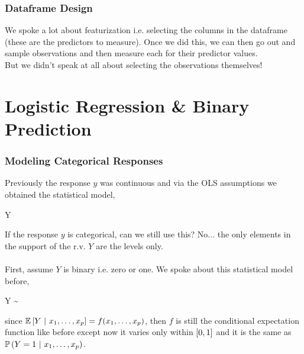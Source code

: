 \documentclass[handout]{beamer}
\begin{document}
\begin{frame}\frametitle{Dataframe Design}

We spoke a lot about featurization i.e. selecting the columns in the dataframe (these are the predictors to measure). Once we did this, we can then go out and sample observations and then measure each for their predictor values. \\

But we didn't speak at all about selecting the observations themselves!


	
\end{frame}



\section{Logistic Regression \& Binary Prediction}


\begin{frame}\frametitle{Modeling Categorical Responses}

Previously the response $y$ was continuous and via the OLS assumptions we obtained the statistical model,

\beqn
Y \inddist {}
\eeqn

If the response $y$ is categorical, can we still use this? No... the only elements in the support of the r.v. $Y$ are the levels only. \\~\\

First, assume $Y$ is binary i.e. zero or one. We spoke about this statistical model before,

\beqn
Y \sim {}
\eeqn

since $\mathbb{E}\left[Y~|~x_1, \ldots, x_p\right] = f(x_1, \ldots, x_p)$, then $f$ is still the conditional expectation function like before except now it varies only within \pause $\left[0,1\right]$ and it is the same as $\mathbb{P}\left(Y = 1~|~x_1, \ldots, x_p\right)$.
	
\end{frame}

\begin{frame}\frametitle{}

	
\end{frame}

\begin{frame}\frametitle{}

	
\end{frame}
\end{document}
